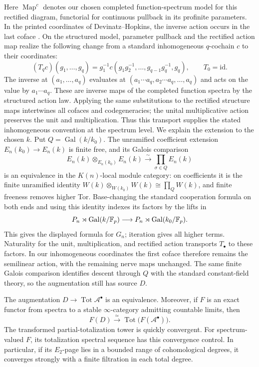 Here \(\operatorname{Map}^c\) denotes our chosen completed
function-spectrum model for this rectified diagram, functorial for
continuous pullback in its profinite parameters. In the printed
coordinates of Devinatz--Hopkins, the inverse action occurs in the
last coface \cite[Definition~4.18 and Lemma~4.22]{DevinatzHopkins}.
On the structured model, parameter pullback and the rectified action
map realize the following change from a standard inhomogeneous
\(q\)-cochain \(c\) to their coordinates:
\[
(T_qc)(g_1,\ldots,g_q)=
g_1^{-1}c(g_1g_2^{-1},\ldots,g_{q-1}g_q^{-1},g_q),
\qquad T_0=\mathrm{id}.
\]
The inverse at \((a_1,\ldots,a_q)\) evaluates at
\((a_1\cdots a_q,a_2\cdots a_q,\ldots,a_q)\) and acts on the value by
\(a_1\cdots a_q\). These are inverse maps of the completed function
spectra by the structured action law. Applying the same substitutions
to the rectified structure maps intertwines all cofaces and
codegeneracies; the unital multiplicative action preserves the unit
and multiplication. Thus this transport supplies the stated
inhomogeneous convention at the spectrum level.
We explain the extension to the chosen \(k\). Put
\(Q=\operatorname{Gal}(k/k_0)\). The unramified coefficient extension
\(E_n(k_0)\to E_n(k)\) is finite free, and its Galois comparison
\[
E_n(k)\otimes_{E_n(k_0)}E_n(k)
 \xrightarrow{\;\sim\;}\prod_{\sigma\in Q}E_n(k)
\]
is an equivalence in the \(K(n)\)-local module category: on
coefficients it is the finite unramified identity
\(W(k)\otimes_{W(k_0)}W(k)\cong\prod_Q W(k)\), and finite freeness
removes higher Tor. Base-changing the standard cooperation formula
on both ends and using this identity indexes its factors by the
lifts in
\[
P_n\rtimes\operatorname{Gal}(k/\mathbb F_p)
 \longrightarrow P_n\rtimes\operatorname{Gal}(k_0/\mathbb F_p).
\]
This gives the displayed formula for \(G_n\); iteration gives all
higher terms. Naturality for the unit, multiplication, and rectified
action transports \(T_\bullet\) to these factors. In our inhomogeneous
coordinates the first coface therefore remains the semilinear action,
with the remaining nerve maps unchanged. The same
finite Galois comparison identifies descent through \(Q\) with the
standard constant-field theory, so the augmentation still has
source \(D\).

\begin{proposition}
\label{spec:exact-descent}
The augmentation \(D\to\operatorname{Tot}\mathcal A^\bullet\) is an
equivalence. Moreover, if \(F\) is an exact functor from spectra to a
stable \(\infty\)-category admitting countable limits, then
\begin{equation}
F(D)\xrightarrow{\;\simeq\;}
\operatorname{Tot}\bigl(F(\mathcal A^\bullet)\bigr).
\label{spec:exact-totalization}
\end{equation}
The transformed partial-totalization tower is quickly convergent.
For spectrum-valued \(F\), its totalization spectral sequence has
this convergence control. In particular, if its
\(E_2\)-page lies in a bounded range of cohomological degrees, it
converges strongly with a finite filtration in each total degree.
\end{proposition}

